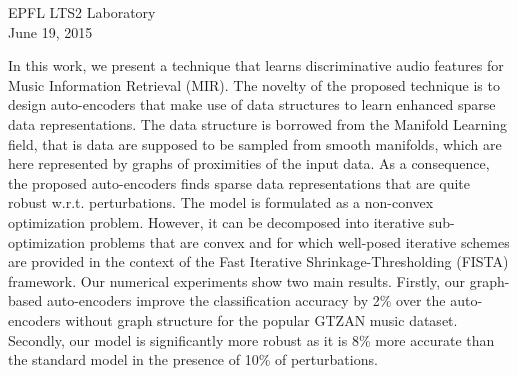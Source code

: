 \documentclass[a4paper,12pt,oneside]{report}
\begin{document}
\begin{titlepage}
\begin{center}
		\vspace{1.5cm}
		\large EPFL LTS2 Laboratory\\
		\vspace{0.8cm}
		\large June 19, 2015
		
	\end{center}
	
\end{titlepage}



\def\abstract{
	\vfil
	\begin{center}
		{\bfseries \abstractname\vspace{-.5em}}
	\end{center}
	\quotation
}
\def\endabstract{\par
	\endquotation
}

\pagestyle{empty}
\begin{abstract}
	In this work, we present a technique that learns discriminative audio features for Music Information Retrieval (MIR). The novelty of the proposed technique is to design auto-encoders that make use of data structures to learn enhanced sparse data representations. The data structure is borrowed from the Manifold Learning field, that is data are supposed to be sampled from smooth manifolds, which are here represented by graphs of proximities of the input data. As a consequence, the proposed auto-encoders finds sparse data representations that are quite robust w.r.t. perturbations. The model is formulated as a non-convex optimization problem. However, it can be decomposed into iterative sub-optimization problems that are convex and for which well-posed iterative schemes are provided in the context of the Fast Iterative Shrinkage-Thresholding (FISTA) framework. Our numerical experiments show two main results. Firstly, our graph-based auto-encoders improve the classification accuracy by 2\% over the auto-encoders without graph structure for the popular GTZAN music dataset. Secondly, our model is significantly more robust as it is 8\% more accurate than the standard model in the presence of 10\% of perturbations.
\end{abstract}
\end{document}
